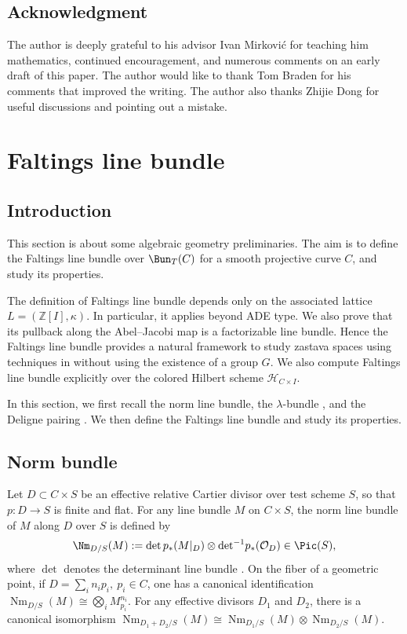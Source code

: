 \documentclass{amsart}
\numberwithin{equation}{section}
\numberwithin{figure}{section}
\theoremstyle{definition}
\theoremstyle{remark}
\renewcommand{\c}[1]{\mathcal{#1}}
\renewcommand{\b}[1]{\mathbb{#1}}
\begin{document}
\subsection{Acknowledgment}
The author is deeply grateful to his advisor Ivan Mirkovi\'c for teaching him mathematics, continued encouragement, and numerous comments on an early draft of this paper. The author would like to thank Tom Braden for his  comments that improved the writing. The author also thanks Zhijie Dong for useful discussions and pointing out a mistake.
	
\section{Faltings line bundle}
\subsection{Introduction}
This section is about some algebraic geometry preliminaries. The aim is to define the Faltings line bundle \cite{faltings2003algebraic} over $\Bun_T(C)$ for a smooth projective curve $C$, and study its properties.

The definition of Faltings line bundle depends only on the associated lattice $L=(\b Z[I],\kappa)$. In particular, it applies beyond ADE type. We also prove that its pullback  along the Abel--Jacobi map is a factorizable line bundle. 
Hence the Faltings line bundle provides a natural framework to study zastava spaces using techniques in \cite{mirkovic2021loop,mirkovic2023lattice} without using the existence of a group $G$. 
We also compute Faltings line bundle explicitly over the colored Hilbert scheme $\c H_{C\times I}$.

In this section, we first recall the norm line bundle, the $\lambda$-bundle \cite{beilinson2004chiral}, and the Deligne pairing \cite{deligne67determinant}. We then define the Faltings line bundle and study its properties.



\subsection{Norm bundle}\cite{deligne67determinant}\label{normbundle}
Let $D\subset C\times S$ be an effective relative Cartier divisor over test scheme $S$, so that 
$p: D\to S$ is finite and flat. For any line bundle $M$ on $C\times S$, 
the norm line bundle of $M$ along $D$ over $S$ is defined by
\[\Nm_{D/S}(M):=\det p_*(M|_D)\otimes \det\!^{-1} p_*(\c O_D)\in\Pic(S),\]
where $\det$ denotes the determinant line bundle \cite{knudsen1976projectivity}.
On the fiber of a geometric point, if $D=\sum_i n_i p_i,\  p_i\in C$, one has a canonical identification
$\operatorname{Nm}_{D/S}(M)\cong \bigotimes_i M_{p_i}^{n_i}.$ 
For any effective divisors $D_1$ and $D_2$, 
there is a canonical isomorphism
$\operatorname{Nm}_{D_1+D_2/S}(M)
\cong
\operatorname{Nm}_{D_1/S}(M)\otimes \operatorname{Nm}_{D_2/S}(M).$
\end{document}
